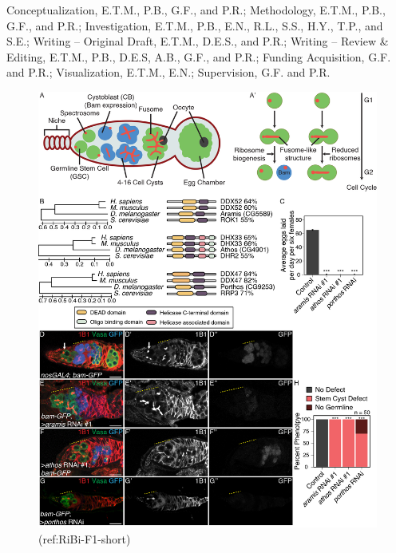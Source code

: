\documentclass[12pt,oneside]{reedthesis}
\begin{document}
Conceptualization, E.T.M., P.B., G.F., and P.R.; Methodology, E.T.M.,
P.B., G.F., and P.R.; Investigation, E.T.M., P.B., E.N., R.L., S.S.,
H.Y., T.P., and S.E.; Writing -- Original Draft, E.T.M., D.E.S., and
P.R.; Writing -- Review \& Editing, E.T.M., P.B., D.E.S, A.B., G.F., and
P.R.; Funding Acquisition, G.F. and P.R.; Visualization, E.T.M., E.N.;
Supervision, G.F. and P.R.
\begin{figure}

{\centering \includegraphics[width=6.5 in,height=8.9375 in]{./figure/Ribosome Biogenesis/Ribosome Biogenesis 1} 

}

\caption[(ref:RiBi-F1-short)]{(ref:RiBi-F1-short)}\label{fig:unnamed-chunk-6}
\end{figure}
\end{document}
